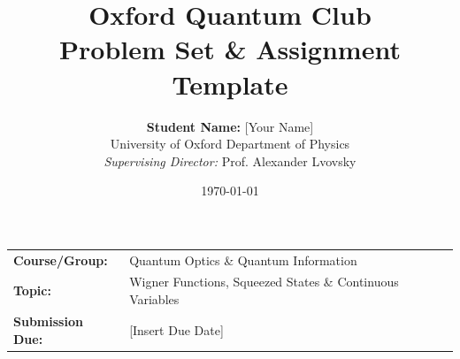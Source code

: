 \documentclass[11pt, a4paper]{article}
\title{%
  \vspace{-1.5cm}
  \color{OxfordBlue}\huge\bfseries Oxford Quantum Club \\[0.3em]
  \Large Problem Set \& Assignment Template
}
\author{%
  \textbf{Student Name:} [Your Name] \\[0.2em]
  \small University of Oxford \;\cdot\; Department of Physics \\[0.2em]
  \small \textit{Supervising Director:} Prof. Alexander Lvovsky
}
\date{\small \today}
\begin{document}
\maketitle
\thispagestyle{fancy}

\begin{center}
\small
\begin{tabular}{ll}
  \textbf{Course/Group:} & Quantum Optics \& Quantum Information \\
  \textbf{Topic:} & Wigner Functions, Squeezed States \& Continuous Variables \\
  \textbf{Submission Due:} & [Insert Due Date] \\
\end{tabular}
\end{center}

\vspace{0.5em}

\end{document}
